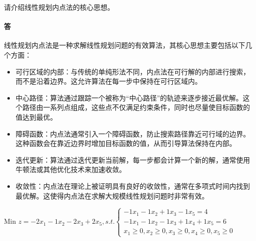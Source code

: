 \documentclass[a4paper]{article}
\begin{document}
请介绍线性规划内点法的核心思想。

\paragraph{答}

线性规划内点法是一种求解线性规划问题的有效算法，其核心思想主要包括以下几个方面：

\begin{itemize}
    \item 可行区域的内部：与传统的单纯形法不同，内点法在可行解的内部进行搜索，而不是沿着边界。这允许算法在每一步中保持在可行区域内。
    \item 中心路径：算法通过跟踪一个被称为“中心路径”的轨迹来逐步接近最优解。这个路径由一系列点组成，这些点不仅满足约束条件，同时也尽量使目标函数的值达到最优。
    \item 障碍函数：内点法通常引入一个障碍函数，防止搜索路径靠近可行域的边界。这种函数会在靠近边界时增加目标函数的值，从而引导算法保持在内部。
    \item 迭代更新：算法通过迭代更新当前解，每一步都会计算一个新的解，通常使用牛顿法或其他优化技术来加速收敛。
    \item 收敛性：内点法在理论上被证明具有良好的收敛性，通常在多项式时间内找到最优解。这使得内点法在求解大规模线性规划问题时非常有效。
\end{itemize}
Min \(z=-2x_1-1x_2-2x_3+2x_5 , s.t. \left\{\begin{aligned}
  -1x_1-1x_2+1x_3-1x_5=4 \\
  -1x_1-1x_2-1x_3+1x_4+1x_5=6 \\
x_1 \geq 0,x_2 \geq 0,x_3 \geq 0,x_4 \geq 0,x_5 \geq 0
\end{aligned}\right.\)
\end{document}
